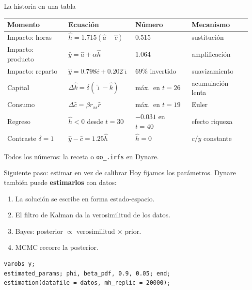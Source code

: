 \begin{frame}[label=resumen]{La historia en una tabla}
  \centering\scriptsize
  \renewcommand{\arraystretch}{1.3}
  \setlength{\tabcolsep}{4pt}
  \begin{tabular}{@{}llll@{}}
    \toprule
    \textbf{Momento} & \textbf{Ecuación} & \textbf{Número} & \textbf{Mecanismo}\\
    \midrule
    Impacto: horas & $\hat h=1.715(\hat a-\hat c)$ & 0.515 & sustitución\\
    Impacto: producto & $\hat y=\hat a+\alpha\hat h$ & 1.064 & amplificación\\
    Impacto: reparto & $\hat y=0.798\hat c+0.202\hat\imath$ & 69\% invertido & suavizamiento\\
    Capital & $\Delta\hat k=\delta(\hat\imath-\hat k)$ & máx.\ en $t=26$ & acumulación lenta\\
    Consumo & $\Delta\hat c=\beta r_{ss}\hat r$ & máx.\ en $t=19$ & Euler\\
    Regreso & $\hat h<0$ desde $t=30$ & $-0.031$ en $t=40$ & efecto riqueza\\
    Contraste $\delta=1$ & $\hat y-\hat c=1.25\hat h$ & $\hat h=0$ & $c/y$ constante\\
    \bottomrule
  \end{tabular}
  \par\vspace{0.35cm}\raggedright\normalsize
  Todos los números: la receta o \texttt{oo\_.irfs} en Dynare.
\end{frame}

\begin{frame}[fragile,label=estimacion]{Siguiente paso: estimar en vez de calibrar}
  Hoy fijamos los parámetros. Dynare también puede \textbf{estimarlos} con datos:\par
  \vspace{0.25cm}
  \begin{enumerate}
    \item La solución se escribe en forma estado-espacio.\par\vspace{0.1cm}
    \item El filtro de Kalman da la verosimilitud de los datos.\par\vspace{0.1cm}
    \item Bayes: posterior $\propto$ verosimilitud $\times$ prior.\par\vspace{0.1cm}
    \item MCMC recorre la posterior.
  \end{enumerate}
  \vspace{0.2cm}
  \begin{lstlisting}
varobs y;
estimated_params; phi, beta_pdf, 0.9, 0.05; end;
estimation(datafile = datos, mh_replic = 20000);
\end{lstlisting}
\end{frame}

